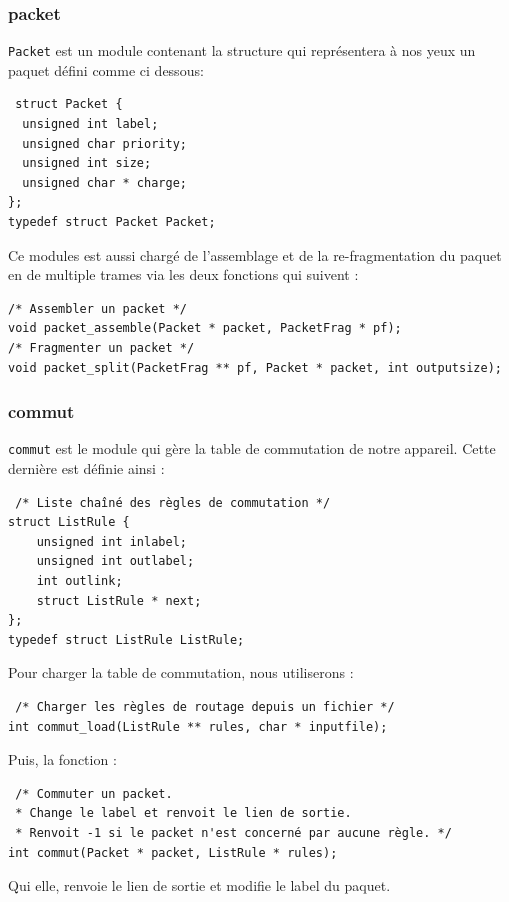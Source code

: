 \documentclass[a4paper,11pt]{article}
\begin{document}
\subsubsection{packet}
\texttt{Packet} est un module contenant la structure qui représentera à
nos yeux un paquet défini comme ci dessous:
\begin{verbatim}
 struct Packet {
  unsigned int label;
  unsigned char priority;
  unsigned int size;
  unsigned char * charge;
};
typedef struct Packet Packet;
\end{verbatim}
Ce modules est aussi chargé de l'assemblage et de la re-fragmentation du
paquet en de multiple trames via les deux fonctions qui suivent :
\begin{verbatim}
/* Assembler un packet */
void packet_assemble(Packet * packet, PacketFrag * pf);
/* Fragmenter un packet */
void packet_split(PacketFrag ** pf, Packet * packet, int outputsize);
\end{verbatim}




\subsubsection{commut}
\texttt{commut} est le module qui gère la table de commutation de notre
appareil. Cette dernière est définie ainsi :
\begin{verbatim}
 /* Liste chaîné des règles de commutation */
struct ListRule {
    unsigned int inlabel;
    unsigned int outlabel;
    int outlink;
    struct ListRule * next;
};
typedef struct ListRule ListRule;
\end{verbatim}
Pour charger la table de commutation, nous utiliserons :
\begin{verbatim}
 /* Charger les règles de routage depuis un fichier */
int commut_load(ListRule ** rules, char * inputfile);
\end{verbatim}
Puis, la fonction :
\begin{verbatim}
 /* Commuter un packet.
 * Change le label et renvoit le lien de sortie.
 * Renvoit -1 si le packet n'est concerné par aucune règle. */
int commut(Packet * packet, ListRule * rules);
\end{verbatim}
Qui elle, renvoie le lien de sortie et modifie le label du paquet.
\end{document}
